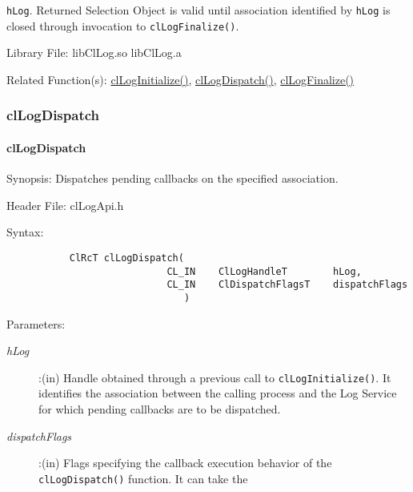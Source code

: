 \begin{flushleft}
\begin{Desc}
{\tt{hLog}}. Returned Selection Object is valid until association identified by {\tt{hLog}} is closed through invocation to {\tt{clLogFinalize()}}.
\end{Desc}
\begin{Desc}
\item[Library File:] libClLog.so 
\newline
libClLog.a
\end{Desc}
\begin{Desc}
\item[Related Function(s):]\hyperlink{pagelog101}{clLogInitialize()}, \hyperlink{pagelog104}{clLogDispatch()}, \hyperlink{pagelog102}{clLogFinalize()}\end{Desc}
\newpage


\subsubsection{clLogDispatch}
\hypertarget{pagelog104}{}\paragraph{cl\-Log\-Dispatch}\label{pagelog104}
\begin{Desc}
\item[Synopsis:] Dispatches pending callbacks on the specified association.\end{Desc}
\begin{Desc}
\item[Header File:] clLogApi.h \end{Desc}
\begin{Desc}
\item[Syntax:]
\footnotesize\begin{verbatim}        	ClRcT clLogDispatch(
           					CL_IN    ClLogHandleT        hLog,
           					CL_IN    ClDispatchFlagsT    dispatchFlags
							   )
\end{verbatim}
\normalsize
\end{Desc}
\begin{Desc}
\item[Parameters:] \begin{description}
\item[{\em hLog}]:(in) Handle obtained through a previous call to {\tt{clLogInitialize()}}. It identifies the association between the calling process and 
the Log Service for which pending callbacks are to be dispatched.
\item[{\em dispatchFlags}]:(in) Flags specifying the callback execution behavior of the {\tt{clLogDispatch()}} function. It can take the

\end{description}
\end{Desc}
\end{flushleft}
